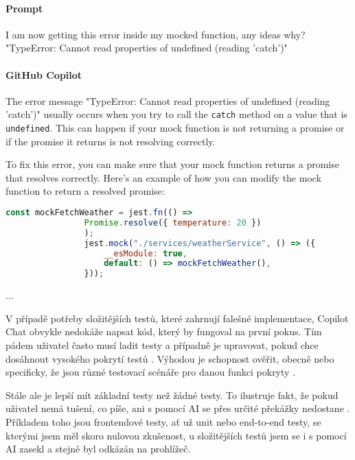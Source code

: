 \documentclass[FM,DP]{tulthesis}
\begin{document}
\begin{tcolorbox}[colback=white,colframe=black,title=Konverzace s opakovaním kódu]
			\paragraph{Prompt}
			I am now getting this error inside my mocked function, any ideas why? "TypeError: Cannot read properties of undefined (reading 'catch')"
			
			\vspace{0.6em}
			
			\paragraph{GitHub Copilot}
			The error message "TypeError: Cannot read properties of undefined (reading 'catch')" usually occurs when you try to call the \verb|catch| method on a value that is \verb|undefined|. This can happen if your mock function is not returning a promise or if the promise it returns is not resolving correctly.
			
			To fix this error, you can make sure that your mock function returns a promise that resolves correctly. Here's an example of how you can modify the mock function to return a resolved promise:
			
			\vspace{0.6em}
			
			\begin{lstlisting}[language=JavaScript]
				const mockFetchWeather = jest.fn(() =>
				Promise.resolve({ temperature: 20 })
				);
				jest.mock("./services/weatherService", () => ({
					__esModule: true,
					default: () => mockFetchWeather(),
				}));
			\end{lstlisting}
			... \cite{mocking_fail}
		\end{tcolorbox}
		
		V případě potřeby složitějších testů, které zahrnují falešné implementace, Copilot Chat obvykle nedokáže napsat kód, který by fungoval na první pokus. Tím pádem uživatel často musí ladit testy a případně je upravovat, pokud chce dosáhnout vysokého pokrytí testů \cite{codecov}. Výhodou je schopnost ověřit, obecně nebo specificky, že jsou různé testovací scénáře pro danou funkci pokryty \cite{TDD} \cite{mocking} \cite{mocking_fail}.
		
		Stále ale je lepší mít základní testy než žádné testy. To ilustruje fakt, že pokud uživatel nemá tušení, co píše, ani s pomocí AI se přes určité překážky nedostane \cite{canvas} \cite{firebase_auth} \cite{firebase}. Příkladem toho jsou frontendové testy, ať už unit nebo end-to-end testy, se kterými jsem měl skoro nulovou zkušenost, u složitějších testů jsem se i s pomocí AI zasekl a stejně byl odkázán na prohlížeč.
		
\end{document}
